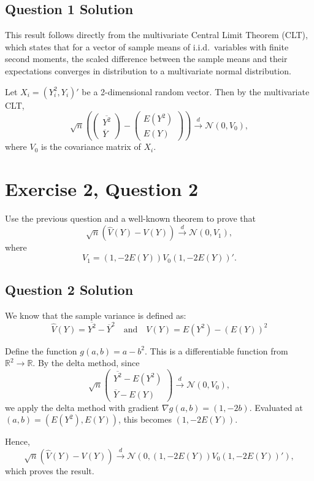 \documentclass{article}
\begin{document}
\subsection{Question 1 Solution}
This result follows directly from the multivariate Central Limit Theorem (CLT), which states that for a vector of sample means of i.i.d.\ variables with finite second moments, the scaled difference between the sample means and their expectations converges in distribution to a multivariate normal distribution.

Let $X_i = (Y_i^2, Y_i)'$ be a 2-dimensional random vector. Then by the multivariate CLT,
\[
\sqrt{n} \left( 
\begin{pmatrix}
\overline{Y^2} \\
\overline{Y}
\end{pmatrix}
-
\begin{pmatrix}
E(Y^2) \\
E(Y)
\end{pmatrix}
\right)
\xrightarrow{d} \mathcal{N}(0, V_0),
\]
where $V_0$ is the covariance matrix of $X_i$.

\section{Exercise 2, Question 2} Use the previous question and a well-known theorem to prove that
\[
\sqrt{n} \left( \widehat{V}(Y) - V(Y) \right) \xrightarrow{d} \mathcal{N}(0, V_1),
\]
where
\[
V_1 = (1, -2E(Y)) V_0 (1, -2E(Y))'.
\]

\subsection{Question 2 Solution}
We know that the sample variance is defined as:
\[
\widehat{V}(Y) = \overline{Y^2} - \overline{Y}^2
\quad \text{and} \quad
V(Y) = E(Y^2) - (E(Y))^2
\]

Define the function $g(a, b) = a - b^2$. This is a differentiable function from $\mathbb{R}^2 \to \mathbb{R}$. By the delta method, since
\[
\sqrt{n} 
\begin{pmatrix}
\overline{Y^2} - E(Y^2) \\
\overline{Y} - E(Y)
\end{pmatrix}
\xrightarrow{d} \mathcal{N}(0, V_0),
\]
we apply the delta method with gradient $\nabla g(a, b) = (1, -2b)$. Evaluated at $(a, b) = (E(Y^2), E(Y))$, this becomes $(1, -2E(Y))$.

Hence,
\[
\sqrt{n} \left( \widehat{V}(Y) - V(Y) \right) \xrightarrow{d} \mathcal{N}\left(0, (1, -2E(Y)) V_0 (1, -2E(Y))' \right),
\]
which proves the result.
\end{document}

